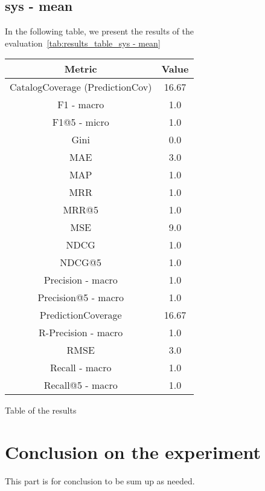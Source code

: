 \documentclass[11pt]{article}
\begin{document}
\subsection{sys - mean}\label{subsec:sys - mean}
In the following table, we present the results of the evaluation~\ref{tab:results_table_sys - mean}

\begin{center}
    \begin{tabular}{|c|c|}
        \hline
        \textbf{Metric} & \textbf{Value} \\ \hline
                CatalogCoverage (PredictionCov) & 16.67 \\ \hline
                F1 - macro & 1.0 \\ \hline
                F1@5 - micro & 1.0 \\ \hline
                Gini & 0.0 \\ \hline
                MAE & 3.0 \\ \hline
                MAP & 1.0 \\ \hline
                MRR & 1.0 \\ \hline
                MRR@5 & 1.0 \\ \hline
                MSE & 9.0 \\ \hline
                NDCG & 1.0 \\ \hline
                NDCG@5 & 1.0 \\ \hline
                Precision - macro & 1.0 \\ \hline
                Precision@5 - macro & 1.0 \\ \hline
                PredictionCoverage & 16.67 \\ \hline
                R-Precision - macro & 1.0 \\ \hline
                RMSE & 3.0 \\ \hline
                Recall - macro & 1.0 \\ \hline
                Recall@5 - macro & 1.0 \\ \hline
             \end{tabular}
    \captionsetup{type=table}
    \caption{Table of the results}
    \label{tab:results_table_sys - mean}
\end{center}
\hfill\break
\hfill\break






\section{Conclusion on the experiment}\label{sec:conclution}
This part is for conclusion to be sum up as needed.
\hfill\break
\hfill\break

\end{document}

